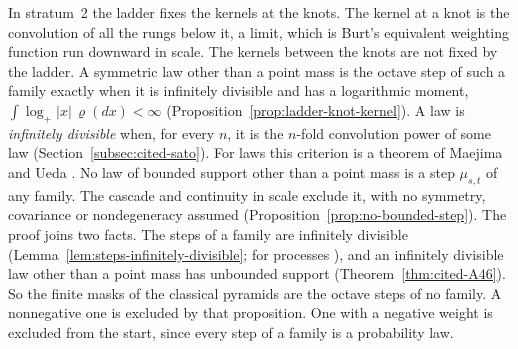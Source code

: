 \begin{enumerate}
In stratum~2 the ladder fixes the kernels at the knots. The kernel at a knot is the convolution of all
the rungs below it, a limit, which is Burt's equivalent weighting function run downward in scale. The kernels between the knots are not fixed by the ladder. A
symmetric law other than a point mass is the octave step of such a family exactly when it is
infinitely divisible and has a logarithmic moment, $\int\log_+|x|\,\varrho(dx) < \infty$
(Proposition~\ref{prop:ladder-knot-kernel}). A law is \emph{infinitely divisible} when, for every
$n$, it is the $n$-fold convolution power of some law (Section~\ref{subsec:cited-sato}). For laws
this criterion is a theorem of Maejima and Ueda \cite[Thm.~3.3, p.~353]{maejima2009stochastic}. No law of
bounded support other than a point mass is a step $\mu_{s,t}$ of any family. The cascade and
continuity in scale exclude it, with no symmetry, covariance or nondegeneracy assumed
(Proposition~\ref{prop:no-bounded-step}). The proof joins two facts. The steps of a family are
infinitely divisible (Lemma~\ref{lem:steps-infinitely-divisible}; for processes
\cite[Thm.~9.1, p.~47]{sato1999levy}), and an infinitely divisible law other than a point mass has
unbounded support (Theorem~\ref{thm:cited-A46}). So the finite masks of the classical pyramids are the
octave steps of no family. A nonnegative one is excluded by that proposition. One with a negative
weight is excluded from the start, since every step of a family is a probability law.


\end{enumerate}
